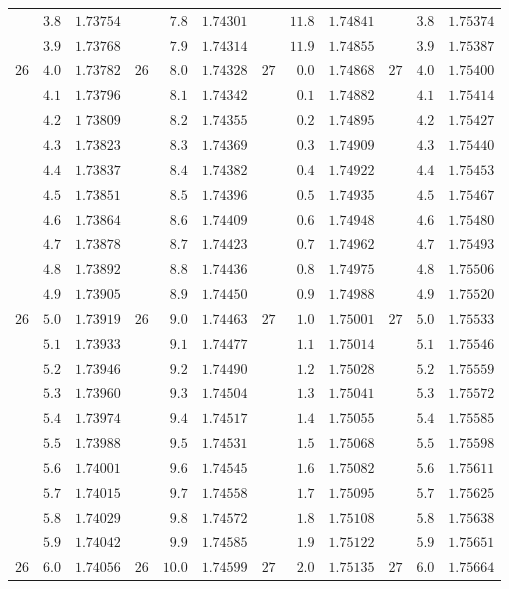 \begin{center}
{{\begin{minipage}[t][500pt][t]{.96\linewidth}
{\begin{tabular}{rr|r||rr|r||rr|r||rr|r}
 & $3.8$ & $1.73754$ &  & $7.8$ & $1.74301$ &  & $11.8$ & $1.74841$ &  & $3.8$ & $1.75374$\\
 & $3.9$ & $1.73768$ &  & $7.9$ & $1.74314$ &  & $11.9$ & $1.74855$ &  & $3.9$ & $1.75387$\\[4pt]
$26$ & $4.0$ & $1.73782$ & $26$ & $8.0$ & $1.74328$ & $27$ & $0.0$ & $1.74868$ & $27$ & $4.0$ & $1.75400$\\
 & $4.1$ & $1.73796$ &  & $8.1$ & $1.74342$ &  & $0.1$ & $1.74882$ &  & $4.1$ & $1.75414$\\
 & $4.2$ & $1\;73809$ &  & $8.2$ & $1.74355$ &  & $0.2$ & $1.74895$ &  & $4.2$ & $1.75427$\\
 & $4.3$ & $1.73823$ &  & $8.3$ & $1.74369$ &  & $0.3$ & $1.74909$ &  & $4.3$ & $1.75440$\\
 & $4.4$ & $1.73837$ &  & $8.4$ & $1.74382$ &  & $0.4$ & $1.74922$ &  & $4.4$ & $1.75453$\\
 & $4.5$ & $1.73851$ &  & $8.5$ & $1.74396$ &  & $0.5$ & $1.74935$ &  & $4.5$ & $1.75467$\\
 & $4.6$ & $1.73864$ &  & $8.6$ & $1.74409$ &  & $0.6$ & $1.74948$ &  & $4.6$ & $1.75480$\\
 & $4.7$ & $1.73878$ &  & $8.7$ & $1.74423$ &  & $0.7$ & $1.74962$ &  & $4.7$ & $1.75493$\\
 & $4.8$ & $1.73892$ &  & $8.8$ & $1.74436$ &  & $0.8$ & $1.74975$ &  & $4.8$ & $1.75506$\\
 & $4.9$ & $1.73905$ &  & $8.9$ & $1.74450$ &  & $0.9$ & $1.74988$ &  & $4.9$ & $1.75520$\\[4pt]
$26$ & $5.0$ & $1.73919$ & $26$ & $9.0$ & $1.74463$ & $27$ & $1.0$ & $1.75001$ & $27$ & $5.0$ & $1.75533$\\
 & $5.1$ & $1.73933$ &  & $9.1$ & $1.74477$ &  & $1.1$ & $1.75014$ &  & $5.1$ & $1.75546$\\
 & $5.2$ & $1.73946$ &  & $9.2$ & $1.74490$ &  & $1.2$ & $1.75028$ &  & $5.2$ & $1.75559$\\
 & $5.3$ & $1.73960$ &  & $9.3$ & $1.74504$ &  & $1.3$ & $1.75041$ &  & $5.3$ & $1.75572$\\
 & $5.4$ & $1.73974$ &  & $9.4$ & $1.74517$ &  & $1.4$ & $1.75055$ &  & $5.4$ & $1.75585$\\
 & $5.5$ & $1.73988$ &  & $9.5$ & $1.74531$ &  & $1.5$ & $1.75068$ &  & $5.5$ & $1.75598$\\
 & $5.6$ & $1.74001$ &  & $9.6$ & $1.74545$ &  & $1.6$ & $1.75082$ &  & $5.6$ & $1.75611$\\
 & $5.7$ & $1.74015$ &  & $9.7$ & $1.74558$ &  & $1.7$ & $1.75095$ &  & $5.7$ & $1.75625$\\
 & $5.8$ & $1.74029$ &  & $9.8$ & $1.74572$ &  & $1.8$ & $1.75108$ &  & $5.8$ & $1.75638$\\
 & $5.9$ & $1.74042$ &  & $9.9$ & $1.74585$ &  & $1.9$ & $1.75122$ &  & $5.9$ & $1.75651$\\[4pt]
$26$ & $6.0$ & $1.74056$ & $26$ & $10.0$ & $1.74599$ & $27$ & $2.0$ & $1.75135$ & $27$ & $6.0$ & $1.75664$
\end{tabular}}
\end{minipage}}}\endgroup
\end{center}
